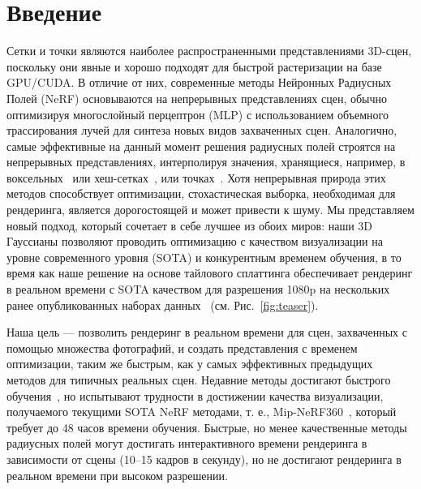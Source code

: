 \section{Введение}

Сетки и точки являются наиболее распространенными представлениями 3D-сцен, поскольку они явные и хорошо подходят для быстрой растеризации на базе GPU/CUDA. 
В отличие от них, современные методы Нейронных Радиусных Полей (NeRF) основываются на непрерывных представлениях сцен, обычно оптимизируя многослойный перцептрон (MLP) с использованием объемного трассирования лучей для синтеза новых видов захваченных сцен. Аналогично, самые эффективные на данный момент решения радиусных полей строятся на непрерывных представлениях, интерполируя значения, хранящиеся, например, в воксельных~\cite{plenoxels} или хеш-сетках~\cite{mueller2022instant}, или точках~\cite{xu2022point}.
Хотя непрерывная природа этих методов способствует оптимизации, стохастическая выборка, необходимая для рендеринга, является дорогостоящей и может привести к шуму.
Мы представляем новый подход, который сочетает в себе лучшее из обоих миров: наши 3D Гауссианы позволяют проводить оптимизацию с качеством визуализации на уровне современного уровня (SOTA) и конкурентным временем обучения,
в то время как наше решение на основе тайлового сплаттинга обеспечивает рендеринг в реальном времени с SOTA качеством для разрешения 1080p на нескольких ранее опубликованных наборах данных~\cite{knapitsch2017tanks,hedman2018deep,barron2022mipnerf360} (см. Рис.~\ref{fig:teaser}).


Наша цель — позволить рендеринг в реальном времени для сцен, захваченных с помощью множества фотографий, и создать представления с временем оптимизации, таким же быстрым, как у самых эффективных предыдущих методов для типичных реальных сцен.
Недавние методы достигают быстрого обучения~\cite{plenoxels,mueller2022instant}, но испытывают трудности в достижении качества визуализации, получаемого текущими SOTA NeRF методами, т. е., Mip-NeRF360~\cite{barron2022mipnerf360}, который требует до 48 часов времени обучения. Быстрые, но менее качественные методы радиусных полей могут достигать интерактивного времени рендеринга в зависимости от сцены (10–15 кадров в секунду), но не достигают рендеринга в реальном времени  при высоком разрешении.

